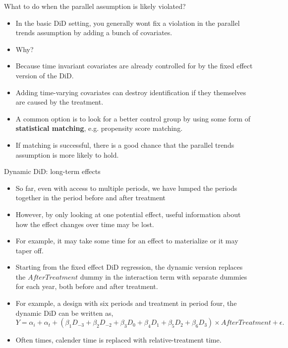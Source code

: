 \documentclass[notes,11pt, aspectratio=169]{beamer}
\begin{document}
\begin{frame}{What to do when the parallel assumption is likely violated?}
   \begin{itemize}
       \item In the basic DiD setting, you generally wont fix a violation in the parallel trends assumption by adding a bunch of covariates.
       \item Why?
       \item Because time invariant covariates are already controlled for by the fixed effect version of the DiD.
       \item Adding time-varying covariates can destroy identification if they themselves are caused by the treatment.
       \item A common option is to look for a better control group by using some form of \textbf{statistical matching}, e.g. propensity score matching.
       \item If matching is successful, there is a good chance that the parallel trends assumption is more likely to hold.
   \end{itemize}
\end{frame}

\begin{frame}{Dynamic DiD: long-term effects}
    \begin{itemize}
        \item So far, even with access to multiple periods, we have lumped the periods together in the period before and after treatment
        \item However, by only looking at one potential effect, useful information about how the effect changes over time may be lost.
        \item For example, it may take some time for an effect to materialize or it may taper off. 
        \item Starting from the fixed effect DiD regression, the dynamic version replaces the $AfterTreatment$ dummy in the interaction term with separate dummies for each year, both before and after treatment. 
        \item For example, a design with six periods and treatment in period four, the dynamic DiD can be written as,
        \begin{equation}
            Y = \alpha_i + \alpha_{t} + \left(\beta_{1}D_{-3}+\beta_{2} D_{-2} +\beta_{3} D_{0} + \beta_{4} D_{1}+ \beta_{5} D_{2} + \beta_{6} D_{3} \right) \times AfterTreatment + \epsilon.
        \end{equation}
        \item Often times, calender time is replaced with relative-treatment time.
    \end{itemize}
\end{frame}
\end{document}
